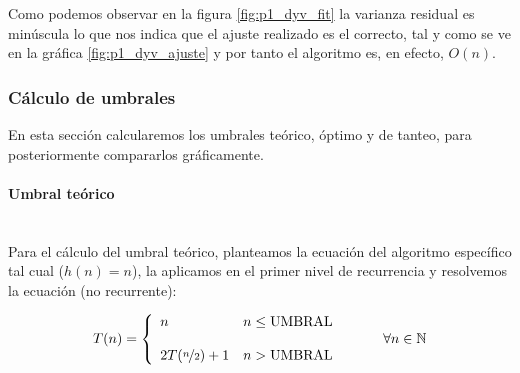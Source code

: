 \documentclass{article}
\newcommand{\myparagraph}[1]{\paragraph{#1}\mbox{}\\}
\newcommand\N{\ensuremath{\mathbb N}\space}
\begin{document}
Como podemos observar en la figura \ref{fig:p1_dyv_fit} la varianza residual es minúscula lo que nos indica que el ajuste realizado es el correcto, tal y como se ve en la gráfica \ref{fig:p1_dyv_ajuste} y por tanto el algoritmo es, en efecto, $O(n)$.

\subsubsection{Cálculo de umbrales} %
    En esta sección calcularemos los umbrales teórico, óptimo y de tanteo,
    para posteriormente compararlos gráficamente. \\

    \myparagraph{Umbral teórico} 
    Para el cálculo del umbral teórico, planteamos la ecuación del algoritmo
    específico tal cual ($h(n)=n$), la aplicamos en el primer nivel de recurrencia y resolvemos la ecuación (no recurrente):

    \begin{equation} \label{eq:ef_dyv_p1}
    T(n) = \left\{ \begin{array}{lcc} n & n \leq \text{UMBRAL}  \\ \\ 
    2T ( \nicefrac{n}{2} ) + 1 &  n > \text{UMBRAL}  \\ \end{array} \right. \hspace{10mm} \forall n \in \N
    \end{equation}
\end{document}
